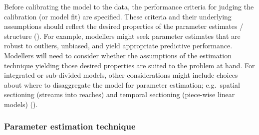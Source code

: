 \documentclass[
]{article}
\begin{document}
\begin{tcolorbox}[enhanced jigsaw, opacitybacktitle=0.6, bottomrule=.15mm, leftrule=.75mm, rightrule=.15mm, colbacktitle=quarto-callout-note-color!10!white, toprule=.15mm, titlerule=0mm, left=2mm, colframe=quarto-callout-note-color-frame, breakable, title=\textcolor{quarto-callout-note-color}{\faInfo}\hspace{0.5em}{Explanation}, opacityback=0, coltitle=black, bottomtitle=1mm, colback=white, toptitle=1mm, arc=.35mm]

Before calibrating the model to the data, the performance criteria for
judging the calibration (or model fit) are specified. These criteria and
their underlying assumptions should reflect the desired properties of
the parameter estimates / structure
(). For example,
modellers might seek parameter estimates that are robust to outliers,
unbiased, and yield appropriate predictive performance. Modellers will
need to consider whether the assumptions of the estimation technique
yielding those desired properties are suited to the problem at hand. For
integrated or sub-divided models, other considerations might include
choices about where to disaggregate the model for parameter estimation;
e.g.~spatial sectioning (streams into reaches) and temporal sectioning
(piece-wise linear models) ().

\end{tcolorbox}

\subsubsection{Parameter estimation
technique}\label{parameter-estimation-technique}
\end{document}
